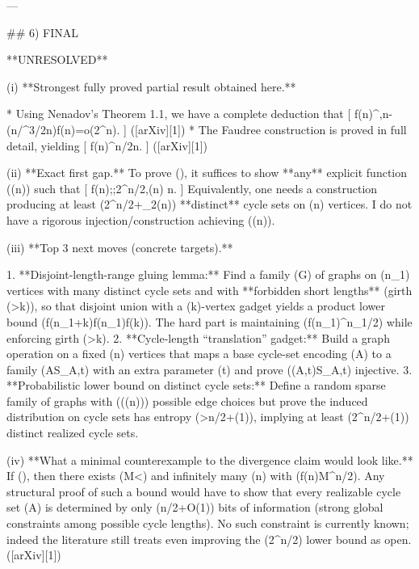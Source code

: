 ---

## 6) FINAL

**UNRESOLVED**

(i) **Strongest fully proved partial result obtained here.**

* Using Nenadov’s Theorem 1.1, we have a complete deduction that
  [
  f(n)^{,n-\Omega(\sqrt n/\log^{3/2}n)}\quad\Longrightarrow\quad f(n)=o(2^n).
  ]
  ([arXiv][1])
* The Faudree construction is proved in full detail, yielding
  [
  f(n)^{\lfloor n/2\rfloor}\quad{}n.
  ]
  ([arXiv][1])

(ii) **Exact first gap.**
To prove (\displaystyle {}\to\infty), it suffices to show **any** explicit function (\omega(n)\to\infty) such that
[
f(n);\ge;2^{n/2},\omega(n)
\quad{}n.
]
Equivalently, one needs a construction producing at least (2^{n/2+\log_2\omega(n)}) **distinct** cycle sets on (n) vertices. I do not have a rigorous injection/construction achieving (\omega(n)\to\infty).

(iii) **Top 3 next moves (concrete targets).**

1. **Disjoint-length-range gluing lemma:** Find a family (\mathcal G) of graphs on (n_1) vertices with many distinct cycle sets and with **forbidden short lengths** (girth (>k)), so that disjoint union with a (k)-vertex gadget yields a product lower bound (f(n_1+k)\gtrsim f(n_1)\cdot f(k)). The hard part is maintaining (f(n_1)^{n_1/2}) while enforcing girth (>k).
2. **Cycle-length “translation” gadget:** Build a graph operation on a fixed (n) vertices that maps a base cycle-set encoding (A) to a family (A\mapsto S_{A,t}) with an extra parameter (t) and prove ((A,t)\mapsto S_{A,t}) injective.
3. **Probabilistic lower bound on distinct cycle sets:** Define a random sparse family of graphs with (\exp(\Theta(n))) possible edge choices but prove the induced distribution on cycle sets has entropy (>n/2+\omega(1)), implying at least (2^{n/2+\omega(1)}) distinct realized cycle sets.

(iv) **What a minimal counterexample to the divergence claim would look like.**
If (\not\to\infty), then there exists (M<\infty) and infinitely many (n) with (f(n)\le M^{n/2}). Any structural proof of such a bound would have to show that every realizable cycle set (A) is determined by only (\le n/2+O(1)) bits of information (strong global constraints among possible cycle lengths). No such constraint is currently known; indeed the literature still treats even improving the (2^{n/2}) lower bound as open. ([arXiv][1])

